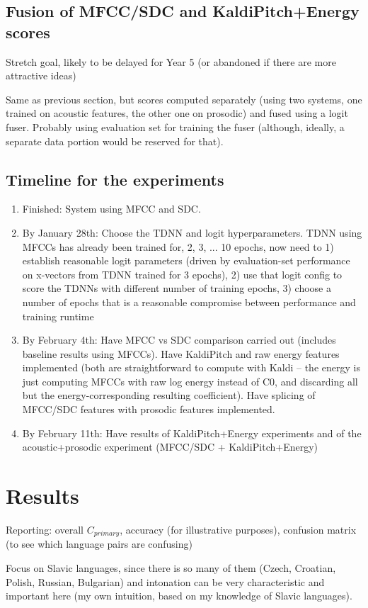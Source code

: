 \documentclass[bsc,frontabs,twoside,singlespacing,parskip,deptreport]{infthesis}
\begin{document}
{  \section{Fusion of MFCC/SDC and KaldiPitch+Energy scores}{
    Stretch goal, likely to be delayed for Year 5 (or abandoned if there are more attractive ideas)

    Same as previous section, but scores computed separately (using two systems, one trained on acoustic features, the other one on prosodic) and fused using a logit fuser. Probably using evaluation set for training the fuser (although, ideally, a separate data portion would be reserved for that).
  }

  \section{Timeline for the experiments}{
    \label{timeline}
    \begin{enumerate}
      \item {
        Finished: System using MFCC and SDC.
      }
      \item {
        By January 28th: Choose the TDNN and logit hyperparameters. TDNN using MFCCs has already been trained for, 2, 3, ... 10 epochs, now need to 1) establish reasonable logit parameters (driven by evaluation-set performance on x-vectors from TDNN trained for 3 epochs), 2) use that logit config to score the TDNNs with different number of training epochs, 3) choose a number of epochs that is a reasonable compromise between performance and training runtime
      }
      \item {
        By February 4th: Have MFCC vs SDC comparison carried out (includes baseline results using MFCCs). Have KaldiPitch and raw energy features implemented (both are straightforward to compute with Kaldi -- the energy is just computing MFCCs with raw log energy instead of C0, and discarding all but the energy-corresponding resulting coefficient). Have splicing of MFCC/SDC features with prosodic features implemented.
      }
      \item {
        By February 11th: Have results of KaldiPitch+Energy experiments and of the acoustic+prosodic experiment (MFCC/SDC + KaldiPitch+Energy)
      }
    \end{enumerate}
  }
}

\chapter{Results}{
  Reporting: overall $C_{primary}$, accuracy (for illustrative purposes), confusion matrix (to see which language pairs are confusing)
  
  Focus on Slavic languages, since there is so many of them (Czech, Croatian, Polish, Russian, Bulgarian) and intonation can be very characteristic and important here (my own intuition, based on my knowledge of Slavic languages).
}
\end{document}

